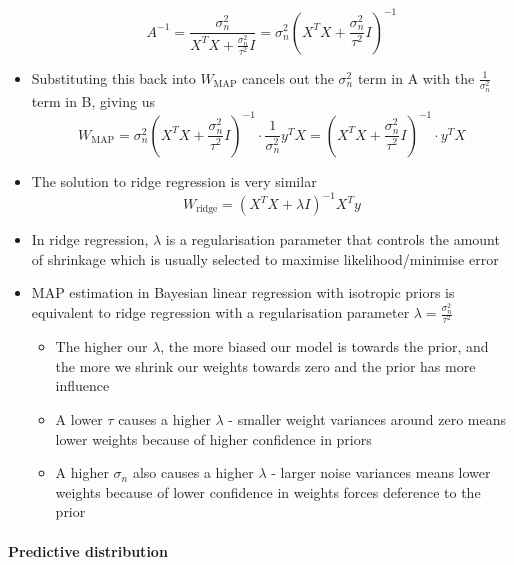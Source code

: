 \documentclass[12pt]{article}
\begin{document}
\begin{itemize}
\begin{equation}
    A^{-1} = \frac{\sigma_n^2}{X^TX + \frac{\sigma_n^2}{\tau^2}I} = \sigma_n^2\left(X^TX + \frac{\sigma_n^2}{\tau^2}I\right)^{-1}
\end{equation}
    \item Substituting this back into $W_\text{MAP}$ cancels out the $\sigma_n^2$ term in A with the $\frac{1}{\sigma_n^2}$ term in B, giving us
\begin{equation}
    W_{\text{MAP}} = \sigma_n^2\left(X^TX + \frac{\sigma_n^2}{\tau^2}I\right)^{-1} \cdot \frac{1}{\sigma_n^2}y^TX = \left(X^TX + \frac{\sigma_n^2}{\tau^2}I\right)^{-1} \cdot y^TX
\end{equation}
    \item The solution to ridge regression is very similar
\begin{equation}
    W_{\text{ridge}} = \left(X^TX + \lambda I\right)^{-1}X^Ty
\end{equation}
    \item In ridge regression, $\lambda$ is a regularisation parameter that controls the amount of shrinkage which is usually selected to maximise likelihood/minimise error
    \item MAP estimation in Bayesian linear regression with isotropic priors is equivalent to ridge regression with a regularisation parameter $\lambda = \frac{\sigma_n^2}{\tau^2}$
        \begin{itemize}
            \item The higher our $\lambda$, the more biased our model is towards the prior, and the more we shrink our weights towards zero and the prior has more influence
            \item A lower $\tau$ causes a higher $\lambda$ - smaller weight variances around zero means lower weights because of higher confidence in priors
            \item A higher $\sigma_n$ also causes a higher $\lambda$ - larger noise variances means lower weights because of lower confidence in weights forces deference to the prior
        \end{itemize}
\end{itemize}


\paragraph{Predictive distribution}
\end{document}
